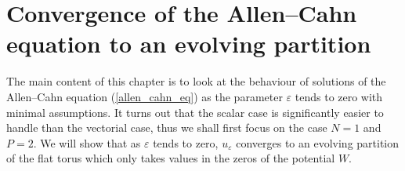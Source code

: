 \chapter{Convergence of the Allen--Cahn equation to an evolving partition}
\label{chapter_convergence_to_evolving_partition}

The main content of this chapter is to look at the behaviour of solutions of 
the Allen--Cahn equation (\ref{allen_cahn_eq}) as the parameter $ \varepsilon $ 
tends to zero with minimal assumptions.
It turns out that the scalar case is 
significantly easier to handle than the vectorial case, thus we shall first 
focus on the case $ N = 1 $ and $ P = 2 $. 
We will show that as $ 
\varepsilon $ 
tends to zero, $ u_{ \varepsilon } $ converges to an evolving partition of the 
flat torus which only takes values in the zeros of the potential $ W $. 






